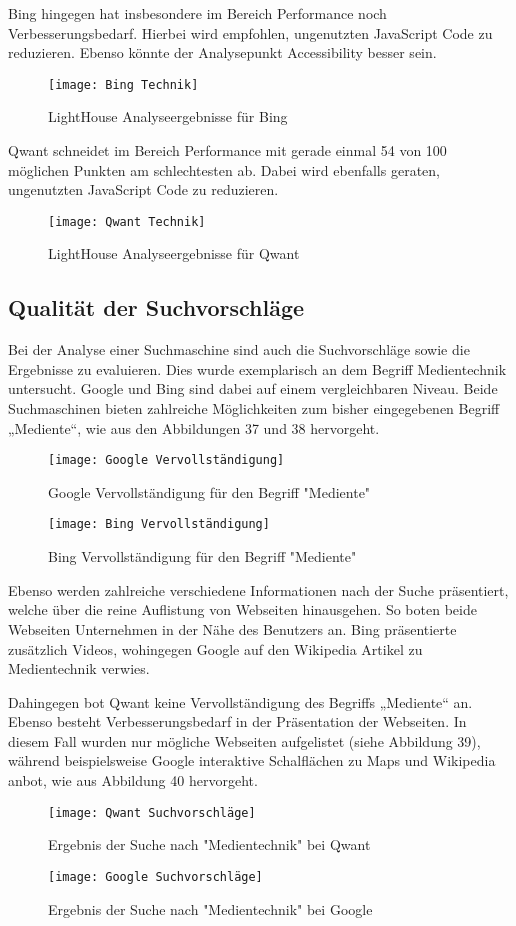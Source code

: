 Bing hingegen hat insbesondere im Bereich Performance noch Verbesserungsbedarf. Hierbei wird empfohlen, ungenutzten JavaScript
Code zu reduzieren. Ebenso könnte der Analysepunkt Accessibility besser sein.
\begin{figure}[h]
    \centering
    \texttt{[image: Bing Technik]}
    \caption{LightHouse Analyseergebnisse für Bing}
\end{figure}

Qwant schneidet im Bereich Performance mit gerade einmal 54 von 100 möglichen Punkten am schlechtesten ab. Dabei wird ebenfalls
geraten, ungenutzten JavaScript Code zu reduzieren.
\begin{figure}[h]
    \centering
    \texttt{[image: Qwant Technik]}
    \caption{LightHouse Analyseergebnisse für Qwant}
\end{figure}

\subsection{Qualität der Suchvorschläge}
Bei der Analyse einer Suchmaschine sind auch die Suchvorschläge sowie die Ergebnisse zu evaluieren. Dies wurde exemplarisch
an dem Begriff Medientechnik untersucht. Google und Bing sind dabei auf einem vergleichbaren Niveau. Beide Suchmaschinen
bieten zahlreiche Möglichkeiten zum bisher eingegebenen Begriff „Mediente“, wie aus den Abbildungen 37 und 38 hervorgeht.
\begin{figure}[h]
    \centering
    \texttt{[image: Google Vervollständigung]}
    \caption{Google Vervollständigung für den Begriff "Mediente"}
\end{figure}

\begin{figure}[h]
    \centering
    \texttt{[image: Bing Vervollständigung]}
    \caption{Bing Vervollständigung für den Begriff "Mediente"}
\end{figure}

Ebenso werden zahlreiche verschiedene Informationen nach der Suche präsentiert, welche über die reine Auflistung von Webseiten
hinausgehen. So boten beide Webseiten Unternehmen in der Nähe des Benutzers an. Bing präsentierte zusätzlich Videos, wohingegen
Google auf den Wikipedia Artikel zu Medientechnik verwies.

Dahingegen bot Qwant keine Vervollständigung des Begriffs „Mediente“ an. Ebenso besteht Verbesserungsbedarf in der Präsentation
der Webseiten. In diesem Fall wurden nur mögliche Webseiten aufgelistet (siehe Abbildung 39), während beispielsweise Google
interaktive Schalflächen zu Maps und Wikipedia anbot, wie aus Abbildung 40 hervorgeht.
\begin{figure}[h]
    \centering
    \texttt{[image: Qwant Suchvorschläge]}
    \caption{Ergebnis der Suche nach "Medientechnik" bei Qwant}
\end{figure}

\begin{figure}[h]
    \centering
    \texttt{[image: Google Suchvorschläge]}
    \caption{Ergebnis der Suche nach "Medientechnik" bei Google}
\end{figure}

